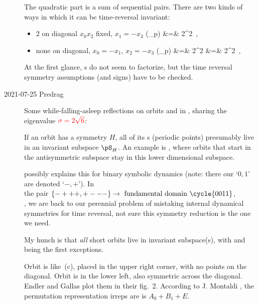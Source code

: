 \begin{description}
The quadratic part is a sum of sequential pairs. There are two kinds of
ways in which it can be time-reversal invariant:
\begin{itemize}
  \item
2 on diagonal ${x_0}{x_2}$ fixed, ${x_1}=-{x_3}$
\bea
\Det(\jMorb_p) &=&
2^2 \left[-2^2{x_0}{x_1}^2{x_2}\right]
\,,
\label{HillDet4D}
\eea
  \item
none on diagonal,  ${x_0}=-{x_1}$,  ${x_2}=-{x_3}$
\bea
\Det(\jMorb_p) &=&
2^2 \left[2^2{x_0}^2{x_2}^2
      +2{x_0}{x_2}+{x_2}^2+{x_0}^2\right]
               \continue
               &=&
2^2 \left[(2{x_0}{x_2})^2
      +({x_0}+{x_2})^2\right]
\,,
\label{HillDet4N}
\eea
\end{itemize}
At the first glance, \HillDet s do not seem to factorize, but
the time reversal symmetry assumptions (and signs) have to be checked.


\item[2021-07-25 Predrag]
Some while-falling-asleep reflections on orbits  and
 in , sharing the eigenvalue
$\textcolor{red}{\sigma=2\sqrt{6}}$:

If an orbit has a symmetry $H$, all of its {\lattstate}s (periodic points)
presumably live in an invariant subspace $\pS_H$. An example
is \KS, where orbits that start in the antisymmetric subspace stay in
this lower dimensional subspace.

 possibly explains this for binary symbolic dynamics
(note: there our `$0,1$' are denoted `$-,+$').
In  
\\
the pair $\{-+++,+---\}\to\mbox{ fundamental domain }\cycle{0011}$,
\\
\ie, we are back to our perennial problem of mistaking internal dynamical
symmetries for time reversal, not sure this symmetry reduction is the one
we need.

My hunch is that {\em all} short orbits live in invariant subspace(s),
with  and  being the first exceptions.

Orbit   is like \,(c), placed in the upper
right corner, with no points on the diagonal. Orbit  is
in the lower left, also symmetric across the diagonal.
Endler and Gallas
plot them in their fig.~2. According to
{J. Montaldi} , the  {permutation
representation} irreps are is $A_0+B_1+E$.


\end{description}
